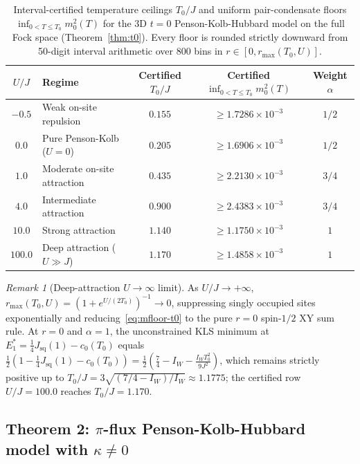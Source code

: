 \documentclass[11pt]{article}
\theoremstyle{definition}
\theoremstyle{remark}
\newtheorem{remark}[theorem]{Remark}
\begin{document}
\begin{table}[ht]
\centering
\caption{Interval-certified temperature ceilings $T_0/J$ and uniform pair-condensate floors $\inf_{0 < T \le T_0} m_0^2(T)$ for the 3D $t=0$ Penson-Kolb-Hubbard model on the full Fock space (Theorem~\ref{thm:t0}). Every floor is rounded strictly downward from 50-digit interval arithmetic over 800 bins in $r \in [0, r_{\max}(T_0, U)]$.}\label{tab:t0-floors}
\begin{tabular}{@{}c l c c c@{}}
\toprule
$U/J$ & Regime & Certified $T_0/J$ & Certified $\inf_{0 < T \le T_0} m_0^2(T)$ & Weight $\alpha$ \\
\midrule
$-0.5$ & Weak on-site repulsion & $0.155$ & $\ge 1.7286 \times 10^{-3}$ & $1/2$ \\
$0.0$  & Pure Penson-Kolb ($U=0$) & $0.205$ & $\ge 1.6906 \times 10^{-3}$ & $1/2$ \\
$1.0$  & Moderate on-site attraction & $0.435$ & $\ge 2.2130 \times 10^{-3}$ & $3/4$ \\
$4.0$  & Intermediate attraction & $0.900$ & $\ge 2.4383 \times 10^{-3}$ & $3/4$ \\
$10.0$ & Strong attraction & $1.140$ & $\ge 1.1750 \times 10^{-3}$ & $1$ \\
$100.0$ & Deep attraction ($U \gg J$) & $1.170$ & $\ge 1.4858 \times 10^{-3}$ & $1$ \\
\bottomrule
\end{tabular}
\end{table}

\begin{remark}[Deep-attraction $U \to \infty$ limit]\label{rem:xy-limit}
As $U/J \to +\infty$, $r_{\max}(T_0, U) = (1 + e^{U/(2T_0)})^{-1} \to 0$, suppressing singly occupied sites exponentially and reducing~\eqref{eq:mfloor-t0} to the pure $r=0$ spin-$1/2$ XY sum rule. At $r = 0$ and $\alpha = 1$, the unconstrained KLS minimum at $E_1^* = \frac{1}{4}J_{\mathrm{sq}}(1) - c_0(T_0)$ equals $\frac{1}{2}(1 - \frac{1}{4}J_{\mathrm{sq}}(1) - c_0(T_0)) = \frac{1}{2}(\frac{7}{4} - I_W - \frac{I_W T_0^2}{9J^2})$, which remains strictly positive up to $T_0/J = 3\sqrt{(7/4 - I_W)/I_W} \approx 1.1775$; the certified row $U/J = 100.0$ reaches $T_0/J = 1.170$.
\end{remark}

\subsection{Theorem 2: \texorpdfstring{$\pi$}{pi}-flux Penson-Kolb-Hubbard model with \texorpdfstring{$\kappa \ne 0$}{kappa != 0}}\label{subsec:thm2}
\end{document}
